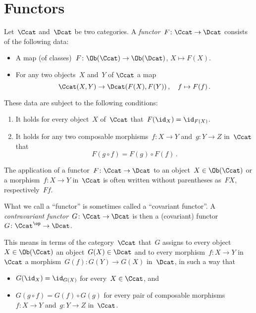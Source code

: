 \section{Functors}


\begin{definition}
  Let~$\Ccat$ and~$\Dcat$ be two categories.
  A \emph{functor}~$F \colon \Ccat \to \Dcat$ consists of the following data:
  \begin{itemize}
    \item
      A map (of classes)~$F \colon \Ob(\Ccat) \to \Ob(\Dcat)$, $X \mapsto F(X)$.
    \item
      For any two objects~$X$ and~$Y$ of $\Ccat$ a map
      \[
                \Ccat(X, Y)
        \to     \Dcat(F(X), F(Y)) \,,
        \quad   f
        \mapsto F(f) \,.
      \]
  \end{itemize}
  These data are subject to the following conditions:
  \begin{enumerate}[label=(F\arabic*)]
    \item
      It holds for every object~$X$ of~$\Ccat$ that~$F(\id_X) = \id_{F(X)}$.
    \item
      It holds for any two composable morphisms~$f \colon X \to Y$ and~$g \colon Y \to Z$ in~$\Ccat$ that
      \[
          F(g \circ f)
        = F(g) \circ F(f) \,.
      \]
  \end{enumerate}
\end{definition}


\begin{notation*}
  The application of a functor~$F \colon \Ccat \to \Dcat$ to an object~$X \in \Ob(\Ccat)$ or a morphism~$f \colon X \to Y$ in~$\Ccat$ is often written without parentheses as~$FX$, respectively~$Ff$.
\end{notation*}


\begin{remark}
  What we call a \enquote{functor} is sometimes called a \enquote{covariant functor}.
  A \emph{contravariant functor}~$G \colon \Ccat \to \Dcat$ is then a (covariant) functor~$G \colon \Ccat^\op \to \Dcat$.
  
  This means in terms of the category~$\Ccat$ that~$G$ assigns to every object~$X \in \Ob(\Ccat)$ an object~$G(X) \in \Dcat$ and to every morphism~$f \colon X \to Y$ in~$\Ccat$ a morphism~$G(f) \colon G(Y) \to G(X)$ in~$\Dcat$, in such a way that
  \begin{itemize}
    \item
      $G(\id_X) = \id_{G(X)}$ for every~$X \in \Ccat$, and
    \item
      $G(g \circ f) = G(f) \circ G(g)$ for every pair of composable morphisms~$f \colon X \to Y$ and~$g \colon Y \to Z$ in~$\Ccat$.
  \end{itemize}
\end{remark}


